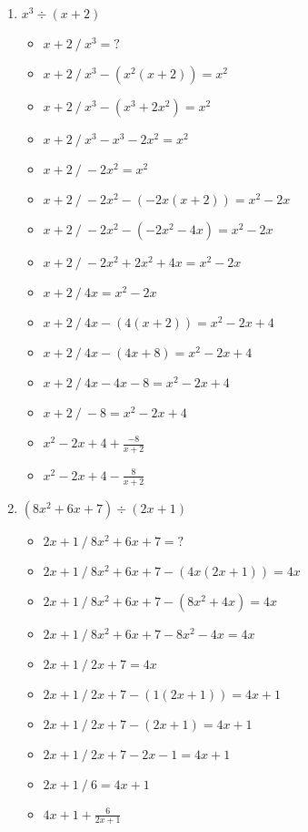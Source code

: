 \documentclass{article}
\begin{document}
\begin{onehalfspace}
\begin{enumerate}
    \item $x^{3} \div (x + 2)$
    \begin{itemize}
        \item $x + 2 \ / \ x^{3} = ?$
        \item $x + 2 \ / \ x^{3} - (x^{2}(x + 2))= x^{2}$
        \item $x + 2 \ / \ x^{3} - (x^{3} + 2x^{2}) = x^{2}$
        \item $x + 2 \ / \ x^{3} - x^{3} - 2x^{2} = x^{2}$
        \item $x + 2 \ / \ - 2x^{2} = x^{2}$
        \item $x + 2 \ / \ - 2x^{2} - (-2x(x + 2))= x^{2} - 2x$
        \item $x + 2 \ / \ - 2x^{2} - (-2x^{2} - 4x)= x^{2} - 2x$
        \item $x + 2 \ / \ - 2x^{2} + 2x^{2} + 4x = x^{2} - 2x$
        \item $x + 2 \ / \ 4x = x^{2} - 2x$
        \item $x + 2 \ / \ 4x - (4(x + 2)) = x^{2} - 2x + 4$
        \item $x + 2 \ / \ 4x - (4x + 8) = x^{2} - 2x + 4$
        \item $x + 2 \ / \ 4x - 4x - 8 = x^{2} - 2x + 4$
        \item $x + 2 \ / \ -8 = x^{2} - 2x + 4$
        \item $x^{2} - 2x + 4 + \frac{-8}{x + 2}$
        \item $x^{2} - 2x + 4 - \frac{8}{x + 2}$
    \end{itemize}

    \item $(8x^{2} + 6x + 7) \div (2x + 1)$
    \begin{itemize}
        \item $2x + 1 \ / \ 8x^{2} + 6x + 7 = ? $
        \item $2x + 1 \ / \ 8x^{2} + 6x + 7 - (4x(2x + 1)) = 4x $
        \item $2x + 1 \ / \ 8x^{2} + 6x + 7 - (8x^{2} + 4x) = 4x $
        \item $2x + 1 \ / \ 8x^{2} + 6x + 7 - 8x^{2} - 4x = 4x $
        \item $2x + 1 \ / \ 2x + 7 = 4x $
        \item $2x + 1 \ / \ 2x + 7 - (1(2x + 1)) = 4x + 1$
        \item $2x + 1 \ / \ 2x + 7 - (2x + 1) = 4x + 1$
        \item $2x + 1 \ / \ 2x + 7 - 2x - 1 = 4x + 1$
        \item $2x + 1 \ / \ 6 = 4x + 1$
        \item $4x + 1 + \frac{6}{2x + 1}$
    \end{itemize}


\end{enumerate}
\end{onehalfspace}
\end{document}
